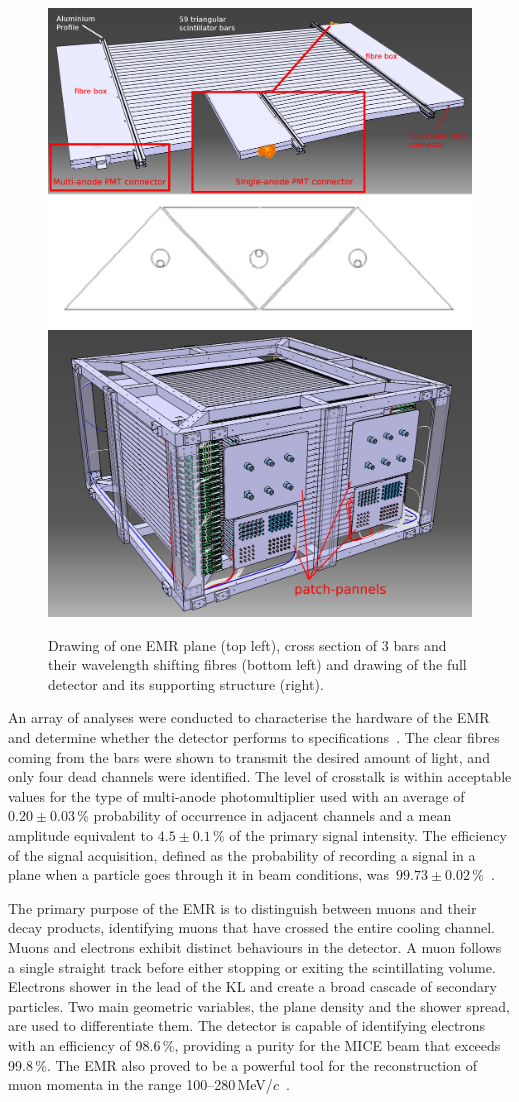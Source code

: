 \begin{figure}[htb!]
	\begin{center}
		\includegraphics[width=0.465\columnwidth]{EMR1.png}
		\hfill
		\includegraphics[width=0.515\columnwidth]{EMR2.jpg}
		\caption{Drawing of one EMR plane (top left), cross section of 3 bars and their wavelength shifting fibres (bottom left) and drawing of the full detector and its supporting structure (right).}
		\label{fig:EMR}
	\end{center}
\end{figure}

An array of analyses were conducted to characterise the hardware of the EMR and determine whether the detector performs to specifications~\cite{Drielsma:2017doj}. The clear fibres coming from the bars were shown to transmit the desired amount of light, and only four dead channels were identified. The level of crosstalk is within acceptable values for the type of multi-anode photomultiplier used with an average of $0.20\pm0.03$\,\% probability of occurrence in adjacent channels and a mean amplitude equivalent to $4.5\pm0.1$\,\% of the primary signal intensity. The efficiency of the signal acquisition, defined as the probability of recording a signal in a plane when a particle goes through it in beam conditions, was~$99.73\pm0.02$\,\%~\cite{2016JInst..11T10007}.

The primary purpose of the EMR is to distinguish between muons and their decay products, identifying
muons that have crossed the entire cooling channel. Muons and electrons exhibit distinct behaviours in the detector. A muon follows a single straight track before either stopping or exiting the scintillating volume. Electrons shower in the lead of the KL and create a broad cascade of secondary particles. Two main geometric variables, the plane density and the shower spread, are used to differentiate them. The detector is capable of identifying electrons with an efficiency of 98.6\,\%, providing a purity for the MICE beam that exceeds 99.8\,\%. The EMR also proved to be a powerful tool for the reconstruction of muon momenta in the range 100--280\,MeV/$c$~\cite{2015JInst..10P2012A}.


